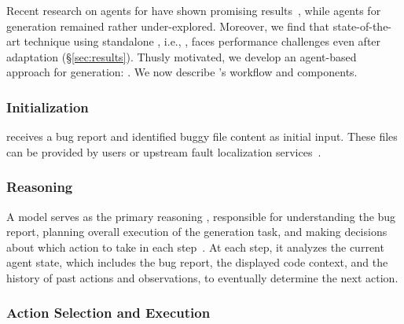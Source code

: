 Recent research on \llm agents for \autopr have shown promising results~\cite{zhang2024autocoderover,yang2024swe,chen2024coder,hou2024large,rondon2025passerine}, while \llm agents for \brt generation remained rather under-explored.
Moreover, we find that state-of-the-art technique using standalone \llm, i.e., \libro, faces performance challenges even after adaptation (\S\ref{sec:results}).
Thusly motivated, we develop an agent-based approach for \brt generation: \tool.
We now describe \tool's workflow and components.


\subsubsection{Initialization}

\tool receives a bug report and identified buggy file content as initial input. These files can be provided by users or upstream fault localization services~\cite{wong2016survey,kang2023preliminary,yang2024large,qin2024agentfl}.

\subsubsection{Reasoning}
\label{sec:approach:agent:reasoning}
A \gemini model serves as the primary reasoning \llm, responsible for understanding the bug report, planning overall execution of the \brt generation task, and making decisions about which action to take in each \react step~\cite{yao2022react}.
At each step, it analyzes the current agent state, which includes the bug report, the displayed code context, and the history of past actions and observations, to eventually determine the next action.

\subsubsection{Action Selection and Execution}
\label{sec:approach:agent:action}



